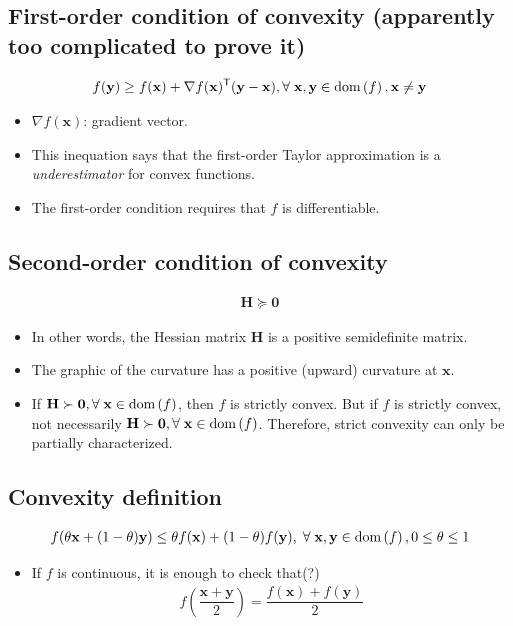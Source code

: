\documentclass{article}
\newcommand{\dom}[1]{\ensuremath{\textnormal{dom}\left(#1\right)}} %
\begin{document}
\subsection{First-order condition of convexity (apparently too complicated to prove it)}
\begin{align}
    f(\mathbf{y}) \geq f(\mathbf{x}) + \nabla f (\mathbf{x})^\mathsf{T} (\mathbf{y} - \mathbf{x}),\forall\;\mathbf{x},\mathbf{y} \in \dom{f}, \mathbf{x}\neq\mathbf{y}
\end{align}
\begin{itemize}
    \item \(\nabla f (\mathbf{x})\): gradient vector.
    \item This inequation says that the first-order Taylor approximation is a \emph{underestimator} for convex functions.
    \item The first-order condition requires that \(f\) is differentiable.
\end{itemize}
\subsection{Second-order condition of convexity}
\begin{align}
    \mathbf{H}\succeq \mathbf{0}
\end{align}
\begin{itemize}
    \item In other words, the Hessian matrix \(\mathbf{H}\) is a positive semidefinite matrix.
    \item The graphic of the curvature has a positive (upward) curvature at \(\mathbf{x}\).
    \item If \(\mathbf{H}\succ\mathbf{0}, \forall\; \mathbf{x} \in \dom{f}\), then \(f\) is strictly convex. But if \(f\) is strictly convex, not necessarily \(\mathbf{H}\succ\mathbf{0},\forall\; \mathbf{x} \in \dom{f}\). Therefore, strict convexity can only be partially characterized.
\end{itemize}
\subsection{Convexity definition}
\begin{align}
    f(\theta\mathbf{x}+(1-\theta)\mathbf{y}) \leq \theta f(\mathbf{x}) + (1-\theta)f(\mathbf{y}),\;\forall\; \mathbf{x}, \mathbf{y} \in \dom{f}, 0\leq\theta\leq 1
\end{align}
\begin{itemize}
	\item If \(f\) is continuous, it is enough to check that(?)
    \begin{align}
        f\left( \dfrac{\mathbf{x}+\mathbf{y}}{2} \right) = \dfrac{f(\mathbf{x}) + f(\mathbf{y})}{2}
    \end{align}
\end{itemize}
\end{document}
